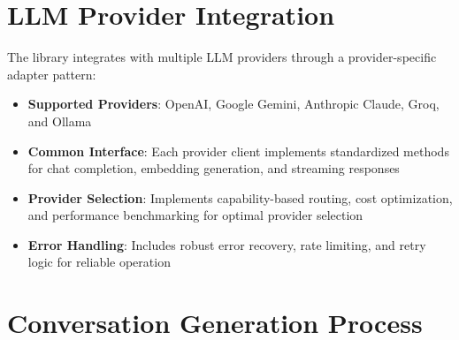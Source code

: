 \section{LLM Provider Integration}

The library integrates with multiple LLM providers through a provider-specific adapter pattern:

\begin{itemize}
    \item \textbf{Supported Providers}: OpenAI, Google Gemini, Anthropic Claude, Groq, and Ollama
    
    \item \textbf{Common Interface}: Each provider client implements standardized methods for chat completion, embedding generation, and streaming responses
    
    \item \textbf{Provider Selection}: Implements capability-based routing, cost optimization, and performance benchmarking for optimal provider selection
    
    \item \textbf{Error Handling}: Includes robust error recovery, rate limiting, and retry logic for reliable operation
\end{itemize}

\section{Conversation Generation Process}

